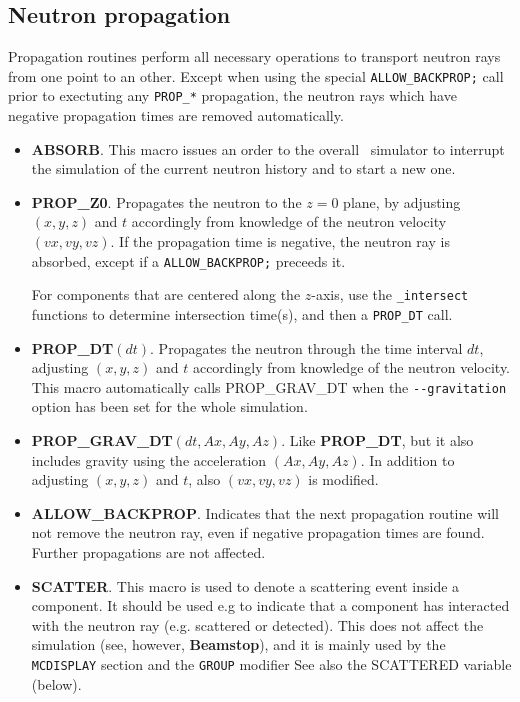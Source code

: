 \subsection{Neutron propagation}
Propagation routines perform all necessary operations to transport neutron rays
from one point to an other. Except when using the special
\verb+ALLOW_BACKPROP;+ call prior to exectuting any \verb+PROP_*+ propagation,
the neutron rays which have negative propagation times are removed automatically.
\begin{itemize}
\item {\bf ABSORB}. This macro issues an order to the overall
  \MCS\ simulator to interrupt the simulation of the current neutron
  history and to start a new one.
\item {\bf PROP\_Z0}. Propagates the neutron to the $z=0$ plane,
  by adjusting $(x,y,z)$ and $t$ accordingly from knowledge of the
  neutron velocity $(vx,vy,vz)$.
  If the propagation time is negative, the neutron ray is absorbed, except if a \verb+ALLOW_BACKPROP;+ preceeds it.

  For components that are centered along the $z$-axis,
  use the \verb+_intersect+ functions to determine intersection time(s),
  and then a \verb+PROP_DT+ call.
\item {\bf PROP\_DT}$(dt)$. Propagates the neutron through the
  time interval $dt$, adjusting $(x,y,z)$ and $t$ accordingly
  from knowledge of the neutron velocity. This macro automatically calls PROP\_GRAV\_DT when the \verb+--gravitation+ option has been set for the whole simulation.
\item {\bf PROP\_GRAV\_DT}$(dt,Ax,Ay,Az)$. Like {\bf PROP\_DT}, but it also
  includes gravity using the acceleration $(Ax,Ay,Az)$. In addition
  to adjusting $(x,y,z)$ and $t$, also $(vx,vy,vz)$ is modified.
\item {\bf ALLOW\_BACKPROP}. Indicates that the next propagation routine
  will not remove the neutron ray, even if negative propagation times
  are found. Further propagations are not affected.
\item {\bf SCATTER}. This macro is used to denote a scattering event
  inside a component.
  It should be used e.g
  to indicate that a component has interacted with the neutron ray
  (e.g. scattered or detected).
  This does not affect the simulation (see, however, {\bf Beamstop}),
  and it is mainly used by the
  \verb+MCDISPLAY+ section and the \verb+GROUP+ modifier
  See also the SCATTERED variable (below).
    
\end{itemize}

